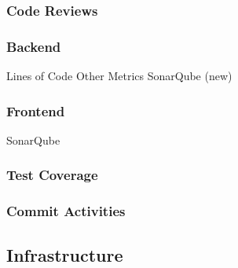 \subsubsection{Code Reviews}

\subsubsection{Backend}
Lines of Code
Other Metrics
SonarQube (new)

\subsubsection{Frontend}
SonarQube

\subsubsection{Test Coverage}

\subsubsection{Commit Activities}


\subsection{Infrastructure}

